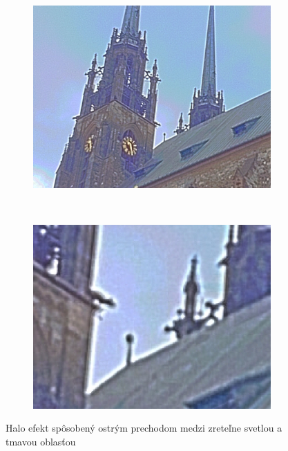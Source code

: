 \begin{figure}[h!]
  \centering
  \begin{subfigure}{0.3\textwidth}
      \includegraphics[width=\textwidth]{figures/tests/tmo/durHalo1}
  \end{subfigure}
  ~
  \begin{subfigure}{0.3\textwidth}
      \includegraphics[width=\textwidth]{figures/tests/tmo/durHalo2}
  \end{subfigure}
  \caption{Halo efekt spôsobený ostrým prechodom medzi zreteľne svetlou a tmavou oblasťou}
  \label{fig:durandHalo}
\end{figure}
